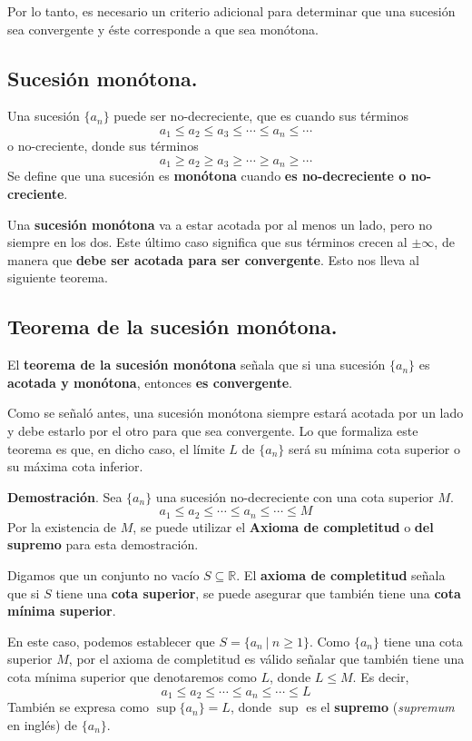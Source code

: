 \documentclass[12pt]{article}
\begin{document}
Por lo tanto, es necesario un criterio adicional para determinar que una sucesión sea convergente y éste corresponde a que sea monótona.

\subsection{Sucesión monótona.}

Una sucesión $\{a_{n}\}$ puede ser no-decreciente, que es cuando sus términos
\[
  a_{1} \leq a_{2} \leq a_{3} \leq \cdots \leq a_{n} \leq \cdots
\]
o no-creciente, donde sus términos
\[
  a_{1} \geq a_{2} \geq a_{3} \geq \cdots \geq a_{n} \geq \cdots
\]
Se define que una sucesión es \textbf{monótona} cuando \textbf{es no-decreciente o no-creciente}.

Una \textbf{sucesión monótona} va a estar acotada por al menos un lado, pero no siempre en los dos. Este último caso significa que sus términos crecen al $\pm \infty$, de manera que \textbf{debe ser acotada para ser convergente}. Esto nos lleva al siguiente teorema.

\subsection{Teorema de la sucesión monótona.}

El \textbf{teorema de la sucesión monótona} señala que si una sucesión $\{a_{n}\}$ es \textbf{acotada y monótona}, entonces \textbf{es convergente}.

Como se señaló antes, una sucesión monótona siempre estará acotada por un lado y debe estarlo por el otro para que sea convergente. Lo que formaliza este teorema es que, en dicho caso, el límite $L$ de $\{a_{n}\}$ será su mínima cota superior o su máxima cota inferior.

\textbf{Demostración}. Sea $\{a_{n}\}$ una sucesión no-decreciente con una cota superior $M$.
\[
  a_{1} \leq a_{2} \leq \cdots \leq a_{n} \leq \cdots \leq M
\]
Por la existencia de $M$, se puede utilizar el \textbf{Axioma de completitud} o \textbf{del supremo} para esta demostración.

Digamos que un conjunto no vacío $S \subseteq \mathbb{R}$. El \textbf{axioma de completitud} señala que si $S$ tiene una \textbf{cota superior}, se puede asegurar que también tiene una \textbf{cota mínima superior}.

En este caso, podemos establecer que $S = \{a_{n} \ | \ n \geq 1\}$. Como $\{a_{n}\}$ tiene una cota superior $M$, por el axioma de completitud es válido señalar que también tiene una cota mínima superior que denotaremos como $L$, donde $L \leq M$. Es decir,
\[
  a_{1} \leq a_{2} \leq \cdots \leq a_{n} \leq \cdots \leq L
\]
También se expresa como $\sup\{a_{n}\} = L$, donde $\sup$ es el \textbf{supremo} (\textit{supremum} en inglés) de $\{a_{n}\}$.
\end{document}

